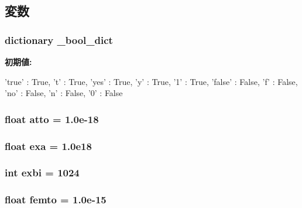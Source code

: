 \subsection{変数}
\hypertarget{namespacem5_1_1util_1_1convert_a7b65d6044db54fa04901d167d56f1abb}{
\subsubsection[{\_\-bool\_\-dict}]{\setlength{\rightskip}{0pt plus 5cm}dictionary {\bf \_\-bool\_\-dict}}}
\label{namespacem5_1_1util_1_1convert_a7b65d6044db54fa04901d167d56f1abb}
{\bfseries 初期値:}
\begin{DoxyCode}
{
    'true' : True,   't' : True,  'yes' : True, 'y' : True,  '1' : True,
    'false' : False, 'f' : False, 'no' : False, 'n' : False, '0' : False
    }
\end{DoxyCode}
\hypertarget{namespacem5_1_1util_1_1convert_a3c5ef72b64145ba7f3e41c96c8fcc11c}{
\subsubsection[{atto}]{\setlength{\rightskip}{0pt plus 5cm}float {\bf atto} = 1.0e-\/18}}
\label{namespacem5_1_1util_1_1convert_a3c5ef72b64145ba7f3e41c96c8fcc11c}
\hypertarget{namespacem5_1_1util_1_1convert_a2d9e7604d19ada1e98cbafc4f7e56461}{
\subsubsection[{exa}]{\setlength{\rightskip}{0pt plus 5cm}float {\bf exa} = 1.0e18}}
\label{namespacem5_1_1util_1_1convert_a2d9e7604d19ada1e98cbafc4f7e56461}
\hypertarget{namespacem5_1_1util_1_1convert_a1b6f03a8e33f35c80c714a13d0ad67e0}{
\subsubsection[{exbi}]{\setlength{\rightskip}{0pt plus 5cm}int {\bf exbi} = 1024}}
\label{namespacem5_1_1util_1_1convert_a1b6f03a8e33f35c80c714a13d0ad67e0}
\hypertarget{namespacem5_1_1util_1_1convert_adabbae2fc2dbe321cd2e88e7943bb4dc}{
\subsubsection[{femto}]{\setlength{\rightskip}{0pt plus 5cm}float {\bf femto} = 1.0e-\/15}}
